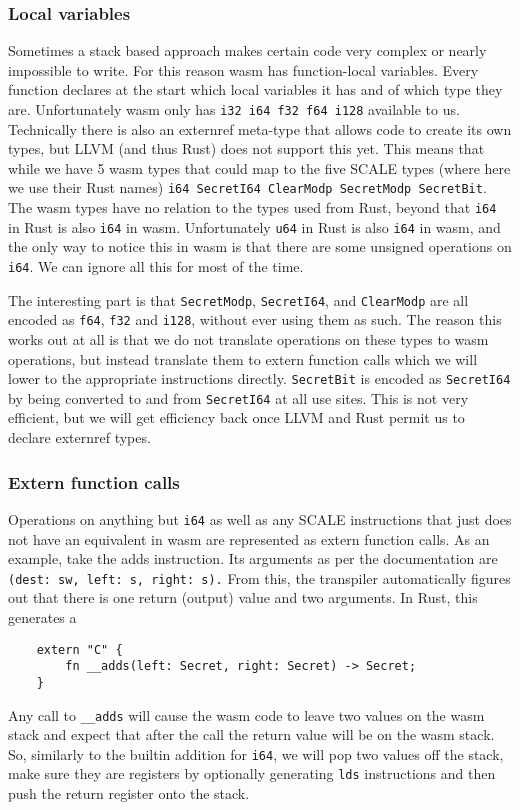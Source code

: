 \subsubsection{Local variables}

Sometimes a stack based approach makes certain code very complex or nearly impossible to write.
For this reason wasm has function-local variables.
Every function declares at the start which local variables it has and of which type they are. Unfortunately wasm only has
\verb|i32 i64 f32 f64 i128| available to us.
Technically there is also an externref meta-type that allows code to create
its own types, but LLVM (and thus Rust) does not support this yet.
This means that while we have 5 wasm types that could map to the five SCALE types (where here we use their Rust names)
\verb|i64 SecretI64 ClearModp SecretModp SecretBit|.
The wasm types have no relation to the types used from Rust, beyond that \verb|i64| in Rust is also
\verb|i64| in wasm. Unfortunately \verb|u64| in Rust is also \verb|i64| in wasm, and the only way
to notice this in wasm is that there are some unsigned operations on \verb|i64|. We can ignore all this for most of the time.

The interesting part is that \verb|SecretModp|, \verb|SecretI64|, and \verb|ClearModp| are all encoded as
\verb|f64|, \verb|f32| and \verb|i128|, without ever using them as such.
The reason this works out at all is that we do not translate operations on these types to wasm operations,
but instead translate them to extern function calls which we will lower to the appropriate instructions directly.
\verb|SecretBit| is encoded as \verb|SecretI64| by being converted to and from \verb|SecretI64| at all use sites.
This is not very efficient, but we will get efficiency back once LLVM and Rust permit us to declare externref types.

\subsubsection{Extern function calls}

Operations on anything but \verb|i64| as well as any SCALE instructions that just does not have an equivalent in wasm
are represented as extern function calls. As an example, take the adds instruction. Its arguments as per the documentation are
\verb|(dest: sw, left: s, right: s).|
From this, the transpiler automatically figures out that there is one return (output) value and two arguments.
In Rust, this generates a
\begin{lstlisting}
    extern "C" {
        fn __adds(left: Secret, right: Secret) -> Secret;
    }
\end{lstlisting}
Any call to \verb|__adds| will cause the wasm code to leave two values on the wasm stack and expect that after
the call the return value will be on the wasm stack. So, similarly to the builtin addition for \verb|i64|,
we will pop two values off the stack, make sure they are registers by optionally generating
\verb|lds| instructions and then push the return register onto the stack.

